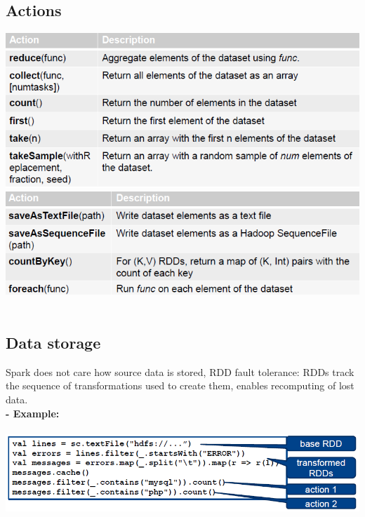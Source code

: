 \documentclass{article}
\begin{document}
\subsection{Actions}
\includegraphics[scale=0.6]{46.png}
\includegraphics[scale=0.6]{47.png}\\\\
\subsection{Data storage}
Spark does not care how source data is stored, RDD fault tolerance: RDDs track the sequence of transformations used to create them, enables recomputing of lost data.\\
\textbf{- Example:}\\\\
\includegraphics[scale=0.6]{48.png}\\\\
\end{document}
